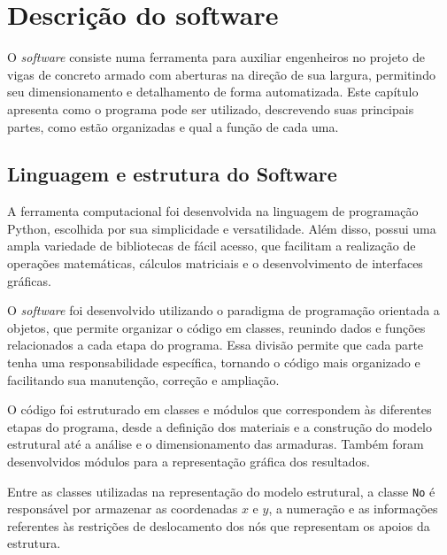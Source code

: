 %
%
%
%


\chapter{Descrição do software}

O \textit{software} consiste numa ferramenta para auxiliar engenheiros no projeto de vigas de concreto armado com aberturas na direção de sua largura, permitindo seu dimensionamento e detalhamento de forma automatizada. Este capítulo apresenta como o programa pode ser utilizado, descrevendo suas principais partes, como estão organizadas e qual a função de cada uma.

\section{Linguagem e estrutura do Software}

A ferramenta computacional foi desenvolvida na linguagem de programação Python, escolhida por sua simplicidade e versatilidade. Além disso, possui uma ampla variedade de bibliotecas de fácil acesso, que facilitam a realização de operações matemáticas, cálculos matriciais e o desenvolvimento de interfaces gráficas.

O \textit{software} foi desenvolvido utilizando o paradigma de programação orientada a objetos, que permite organizar o código em classes, reunindo dados e funções relacionados a cada etapa do programa. Essa divisão permite que cada parte tenha uma responsabilidade específica, tornando o código mais organizado e facilitando sua manutenção, correção e ampliação.

O código foi estruturado em classes e módulos que correspondem às diferentes etapas do programa, desde a definição dos materiais e a construção do modelo estrutural até a análise e o dimensionamento das armaduras. Também foram desenvolvidos módulos para a representação gráfica dos resultados.

Entre as classes utilizadas na representação do modelo estrutural, a classe \texttt{No} é responsável por armazenar as coordenadas \(x\) e \(y\), a numeração e as informações referentes às restrições de deslocamento dos nós que representam os apoios da estrutura.

